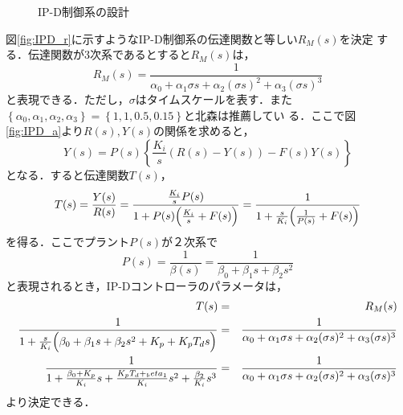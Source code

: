 \documentclass[a4paper,12pt]{jarticle}
\begin{document}
\begin{figure}[tbp]
  \begin{center} 
  \hfill
  \end{center}
  \caption{IP-D制御系の設計}
  \label{fig:IPD}
\end{figure}
%
図\ref{fig:IPD_r}に示すようなIP-D制御系の伝達関数と等しい$R_M(s)$を決定
する．伝達関数が3次系であるとすると$R_M(s)$は，
%
\begin{equation}\label{equ:R_M}
 R_M(s) = \frac{1}{\alpha_0+\alpha_1\sigma s+\alpha_2 (\sigma s)^2+\alpha_3(\sigma s)^3}
\end{equation}
%
と表現できる．ただし，$\sigma$はタイムスケールを表す．また
$\left\{\alpha_0,\alpha_1,\alpha_2,\alpha_3\right\}=\left\{1,1,0.5,0.15\right\}$と北森は推薦してい
る．ここで図\ref{fig:IPD_a}より$R(s),Y(s)$の関係を求めると，
%
\begin{equation}
 Y(s) = P(s)\left\{\frac{K_i}{s}(R(s)-Y(s))-F(s)Y(s) \right\}
\end{equation}
%
となる．すると伝達関数$T(s)$，
%
\begin{equation}
 T(s) = \frac{Y(s)}{R(s)} =
  \frac{\frac{K_i}{s}P(s)}{1+P(s)\Bigl(\frac{K_i}{s}+F(s)\Bigr)} =  \frac{1}{1+\frac{s}{K_i}\Bigl(\frac{1}{P(s)}+F(s)\Bigr)}
\end{equation}
%
を得る．ここでプラント$P(s)$が２次系で
%
\begin{equation}
 P(s) = \frac{1}{\beta (s)} = \frac{1}{\beta_0 + \beta_1 s + \beta_2 s^2}
\end{equation}
%
と表現されるとき，IP-Dコントローラのパラメータは，
%
\begin{eqnarray}
 T(s) & = & R_M(s) \nonumber \\
 \frac{1}{1+\frac{s}{K_i}\Bigl(\beta_0 + \beta_1 s + \beta_2 s^2 +
  K_p+K_p T_d s \Bigr)} & = & \frac{1}{\alpha_0+\alpha_1\sigma
  s+\alpha_2 (\sigma s)^2+\alpha_3(\sigma s)^3} \nonumber \\
 \frac{1}{1+\frac{\beta_0 + K_p}{K_i}s+\frac{K_pT_d+_beta_1}{K_i}s^2+\frac{\beta_2}{K_i}s^3}& = & \frac{1}{\alpha_0+\alpha_1\sigma s+\alpha_2 (\sigma s)^2+\alpha_3(\sigma s)^3}
\end{eqnarray}
%
より決定できる．
%
\end{document}
